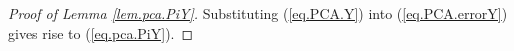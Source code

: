 \documentclass[11pt]{article} %
\begin{document}
\begin{proof}[Proof of Lemma \ref{lem.pca.PiY}]
	Substituting (\ref{eq.PCA.Y}) into (\ref{eq.PCA.errorY}) gives rise to (\ref{eq.pca.PiY}).
	
	
\end{proof}
\end{document}
